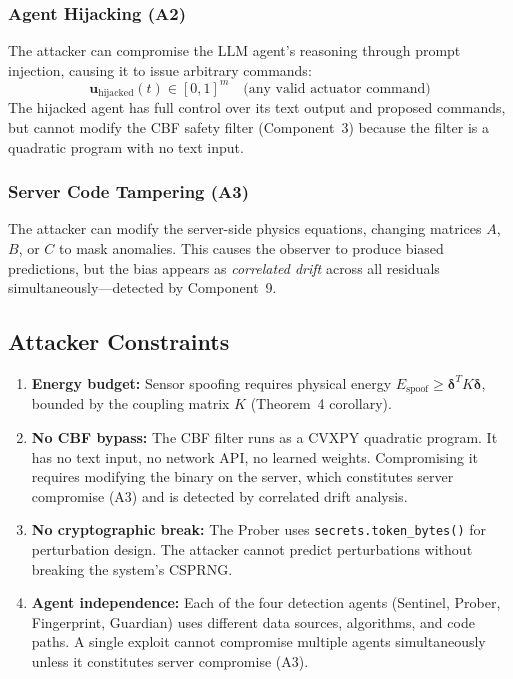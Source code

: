 \documentclass[journal]{IEEEtran}
\begin{document}
\subsubsection{Agent Hijacking (A2)}
The attacker can compromise the LLM agent's reasoning through prompt injection, causing it to issue arbitrary commands:
\begin{equation}
  \bm{u}_{\text{hijacked}}(t) \in [0, 1]^m \quad \text{(any valid actuator command)}
\end{equation}
The hijacked agent has full control over its text output and proposed commands, but cannot modify the CBF safety filter (Component~3) because the filter is a quadratic program with no text input.

\subsubsection{Server Code Tampering (A3)}
The attacker can modify the server-side physics equations, changing matrices $A$, $B$, or $C$ to mask anomalies. This causes the observer to produce biased predictions, but the bias appears as \emph{correlated drift} across all residuals simultaneously---detected by Component~9.

\subsection{Attacker Constraints}

\begin{enumerate}[leftmargin=*]
\item \textbf{Energy budget:} Sensor spoofing requires physical energy $E_{\text{spoof}} \ge \bm{\delta}^T K \bm{\delta}$, bounded by the coupling matrix $K$ (Theorem~4 corollary).

\item \textbf{No CBF bypass:} The CBF filter runs as a CVXPY quadratic program. It has no text input, no network API, no learned weights. Compromising it requires modifying the binary on the server, which constitutes server compromise (A3) and is detected by correlated drift analysis.

\item \textbf{No cryptographic break:} The Prober uses \texttt{secrets.token\_bytes()} for perturbation design. The attacker cannot predict perturbations without breaking the system's CSPRNG.

\item \textbf{Agent independence:} Each of the four detection agents (Sentinel, Prober, Fingerprint, Guardian) uses different data sources, algorithms, and code paths. A single exploit cannot compromise multiple agents simultaneously unless it constitutes server compromise (A3).
\end{enumerate}
\end{document}
